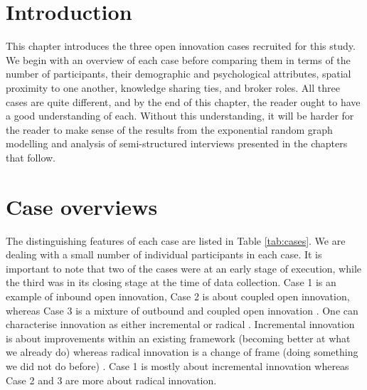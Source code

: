 \section{Introduction}

This chapter introduces the three open innovation cases recruited for this study. We begin with an overview of each case before comparing them in terms of the number of participants, their demographic and psychological attributes, spatial proximity to one another, knowledge sharing ties, and broker roles. All three cases are quite different, and by the end of this chapter, the reader ought to have a good understanding of each. Without this understanding, it will be harder for the reader to make sense of the results from the exponential random graph modelling and analysis of semi-structured interviews presented in the chapters that follow.

\section{Case overviews}

The distinguishing features of each case are listed in Table \ref{tab:cases}. We are dealing with a small number of individual participants in each case. It is important to note that two of the cases were at an early stage of execution, while the third was in its closing stage at the time of data collection. Case 1 is an example of inbound open innovation, Case 2 is about coupled open innovation, whereas Case 3 is a mixture of outbound and coupled open innovation \citep{gassmann2004towards}. One can characterise innovation as either incremental or radical \citep{ettlie1984organization}. Incremental innovation is about improvements within an existing framework (becoming better at what we already do) whereas radical innovation is a change of frame (doing something we did not do before) \citep{norman2014incremental}. Case 1 is mostly about incremental innovation whereas Case 2 and 3 are more about radical innovation.

